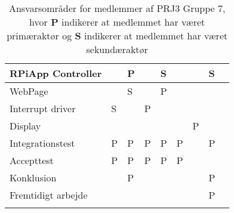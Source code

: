 \documentclass[Rapport/Rapport_main.tex]{subfiles}
\begin{document}
\begin{longtable}{|L{0.2\textwidth}|L{0.082\textwidth}|L{0.08\textwidth}|L{0.08\textwidth}|L{0.08\textwidth}|L{0.08\textwidth}|L{0.08\textwidth}|L{0.08\textwidth}|L{0.08\textwidth}|}
        RPiApp Controller       &               &       P       &               &       S       &               &               &       S       &                \\ \hline
        WebPage                 &               &       S       &               &       P       &               &               &               &                \\ \hline
        Interrupt driver        &       S       &               &       P       &               &               &               &               &                \\ \hline
        Display                 &               &               &               &               &               &       P       &               &                \\ \hline
        Integrationstest        &       P       &       P       &       P       &       P       &       P       &               &       P       &                \\ \hline
        Accepttest              &       P       &       P       &       P       &       P       &       P       &               &               &                \\ \hline
        Konklusion              &               &       P       &               &               &               &               &       P       &                \\ \hline
        Fremtidigt arbejde      &               &               &               &               &               &               &       P       &                \\ \hline
\caption{Ansvarsområder for medlemmer af PRJ3 Gruppe 7, hvor \textbf{P} indikerer at medlemmet har været primæraktør og \textbf{S} indikerer at medlemmet har været sekundæraktør}
\end{longtable}
\end{document}

